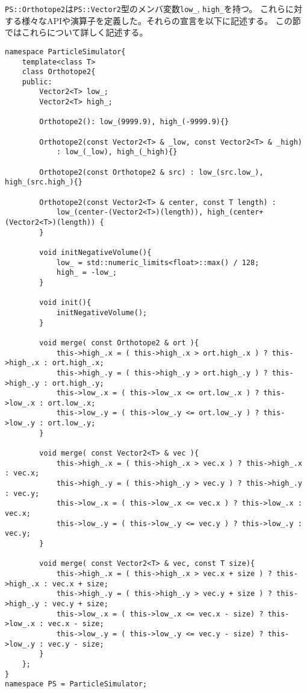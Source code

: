 \texttt{PS::Orthotope2}は\texttt{PS::Vector2}型のメンバ変数\texttt{low\_}, \texttt{high\_}を持つ。
これらに対する様々なAPIや演算子を定義した。それらの宣言を以下に記述する。
この節ではこれらについて詳しく記述する。
\begin{lstlisting}[caption=Orthotope2]
namespace ParticleSimulator{
    template<class T>
    class Orthotope2{
    public:
        Vector2<T> low_;
        Vector2<T> high_;

        Orthotope2(): low_(9999.9), high_(-9999.9){}
        
        Orthotope2(const Vector2<T> & _low, const Vector2<T> & _high)
            : low_(_low), high_(_high){}
        
        Orthotope2(const Orthotope2 & src) : low_(src.low_), high_(src.high_){}

        Orthotope2(const Vector2<T> & center, const T length) :
            low_(center-(Vector2<T>)(length)), high_(center+(Vector2<T>)(length)) {
        }

        void initNegativeVolume(){
            low_ = std::numeric_limits<float>::max() / 128;
            high_ = -low_;
        }

        void init(){
            initNegativeVolume();
        }

        void merge( const Orthotope2 & ort ){
            this->high_.x = ( this->high_.x > ort.high_.x ) ? this->high_.x : ort.high_.x;
            this->high_.y = ( this->high_.y > ort.high_.y ) ? this->high_.y : ort.high_.y;
            this->low_.x = ( this->low_.x <= ort.low_.x ) ? this->low_.x : ort.low_.x;
            this->low_.y = ( this->low_.y <= ort.low_.y ) ? this->low_.y : ort.low_.y;
        }

        void merge( const Vector2<T> & vec ){
            this->high_.x = ( this->high_.x > vec.x ) ? this->high_.x : vec.x;
            this->high_.y = ( this->high_.y > vec.y ) ? this->high_.y : vec.y;
            this->low_.x = ( this->low_.x <= vec.x ) ? this->low_.x : vec.x;
            this->low_.y = ( this->low_.y <= vec.y ) ? this->low_.y : vec.y;
        }

        void merge( const Vector2<T> & vec, const T size){
            this->high_.x = ( this->high_.x > vec.x + size ) ? this->high_.x : vec.x + size;
            this->high_.y = ( this->high_.y > vec.y + size ) ? this->high_.y : vec.y + size;
            this->low_.x = ( this->low_.x <= vec.x - size) ? this->low_.x : vec.x - size;
            this->low_.y = ( this->low_.y <= vec.y - size) ? this->low_.y : vec.y - size;
        }
    };
}
namespace PS = ParticleSimulator;
\end{lstlisting}

